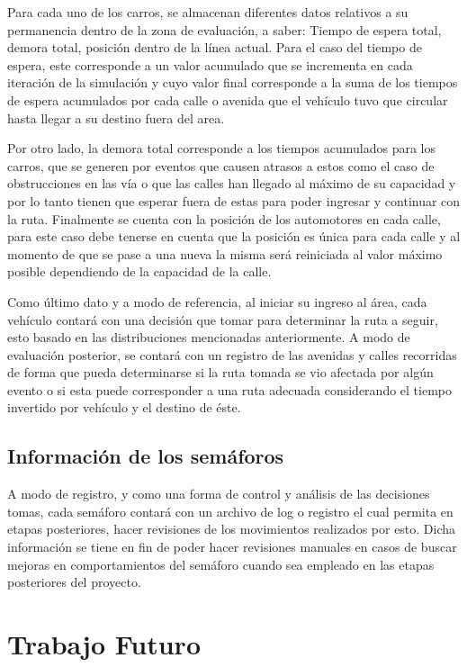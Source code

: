 \documentclass[conference]{IEEEtran}
\begin{document}
Para cada uno de los carros, se almacenan diferentes datos relativos a su permanencia dentro de la zona de evaluaci\'on, a saber: Tiempo de espera total, demora total, posici\'on dentro de la l\'inea actual. Para el caso del tiempo de espera, este corresponde a un valor acumulado que se incrementa en cada iteraci\'on de la simulaci\'on y cuyo valor final corresponde a la suma de los tiempos de espera acumulados por cada calle o avenida que el veh\'iculo tuvo que circular hasta llegar a su destino fuera del area. 

	Por otro lado, la demora total corresponde a los tiempos acumulados para los carros, que se generen por eventos que causen atrasos a estos como el caso de obstrucciones en las v\'ia o que las calles han llegado al m\'aximo de su capacidad y por lo tanto tienen que esperar fuera de estas para poder ingresar y continuar con la ruta. Finalmente se cuenta con la posici\'on de los automotores en cada calle, para este caso debe tenerse en cuenta que la posici\'on es \'unica para cada calle y al momento de que se pase a una nueva la misma ser\'a reiniciada al valor m\'aximo posible dependiendo de la capacidad de la calle.

	Como \'ultimo dato y a modo de referencia, al iniciar su ingreso al \'area, cada veh\'iculo contar\'a con una decisi\'on que tomar para determinar la ruta a seguir, esto basado en las distribuciones mencionadas anteriormente. A modo de evaluaci\'on posterior, se contar\'a con un registro de las avenidas y calles recorridas de forma que pueda determinarse si la ruta tomada se vio afectada por alg\'un evento o si esta puede corresponder a una ruta adecuada considerando el tiempo invertido por veh\'iculo y el destino de \'este. 

\subsection{Informaci\'on de los sem\'aforos}

A modo de registro, y como una forma de control y an\'alisis de las decisiones tomas, cada sem\'aforo contar\'a con un archivo de log o registro el cual permita en etapas posteriores, hacer revisiones de los movimientos realizados por esto. Dicha informaci\'on se tiene en fin de poder hacer revisiones manuales en casos de buscar mejoras en comportamientos del sem\'aforo cuando sea empleado en las etapas posteriores del proyecto.  

\section{Trabajo Futuro}
\end{document}
